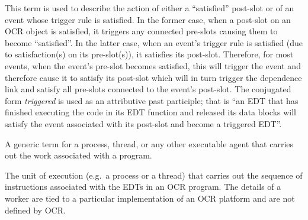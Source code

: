 \glossarydefstart
This term is used to describe the action of either a ``satisfied''
post-slot or of an event whose trigger rule is satisfied. In the
former case, when a post-slot on
an OCR object is satisfied, it triggers any connected
pre-slots causing them to become ``satisfied''. In the latter case,
when an event's trigger rule is satisfied (due to satisfaction(s) on its
pre-slot(s)), it satisfies its post-slot. Therefore, for most events,
when the event's pre-slot becomes satisfied, this will trigger the event and
therefore cause it to satisfy its post-slot which will in turn trigger
the dependence link and satisfy all pre-slots connected to the event's
post-slot. The conjugated form \emph{triggered} is used as an
attributive past participle; that is
``an EDT that has finished executing the code in its EDT function and
released its data blocks will satisfy the event associated
with its post-slot and become a triggered EDT''.
\glossarydefend


\glossarydefstart
A generic term for a process, thread, or any other executable agent
that carries out the work associated with a program.
\glossarydefend



\glossarydefstart
The unit of execution (e.g.\ a process or a thread) that carries out
the sequence of instructions associated with the EDTs in an OCR
program. The details of a worker are tied to a particular
implementation of an OCR platform and are not defined by OCR.
\glossarydefend

